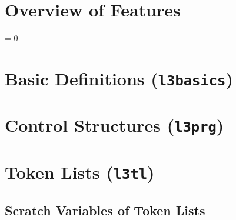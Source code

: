 \documentclass[oneside]{book}
\begin{document}
\chapter{Overview of Features}

\ExplSyntaxOn

\PrgNewFunction {}
  {
    \IntSet {}
    \Result { \IntUse \lTmpaInt }
  }

\PrgNewFunction {}
  {
    \IntSet {}
    \Result { \Value \lTmpaInt }
  }

\PrgNewFunction {}
  {
     = { 0 }
      {  }
      {
        \TlSet \lTmpaTl
          {
             {  }
          }
        \Result { \Value \lTmpaTl }
      }
  }

\ExplSyntaxOff




\chapter{Basic Definitions (\texttt{l3basics})}

 
 

\chapter{Control Structures (\texttt{l3prg})}

\BoolIfTF{}
\BoolIfTF{}

\BoolSetTrue\lTmpaBool
\BoolIfTF{}
\BoolSetFalse\lTmpaBool
\BoolIfTF{}

\chapter{Token Lists (\texttt{l3tl})}

\section{Scratch Variables of Token Lists}
\end{document}
